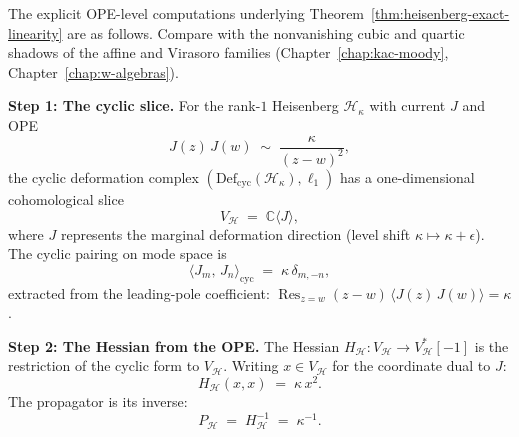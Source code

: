\begin{computation}
\label{comp:heisenberg-shadow-ope-derivation}
The explicit OPE-level computations underlying
Theorem~\ref{thm:heisenberg-exact-linearity} are as follows.
Compare with the nonvanishing cubic and quartic shadows of the affine and
Virasoro families (Chapter~\ref{chap:kac-moody},
Chapter~\ref{chap:w-algebras}).

\medskip
\noindent\textbf{Step 1: The cyclic slice.}
For the rank-$1$ Heisenberg $\mathcal{H}_\kappa$ with current $J$
and OPE
\begin{equation}\label{eq:heisenberg-ope-shadow-section}
 J(z)\,J(w) \;\sim\; \frac{\kappa}{(z-w)^2},
\end{equation}
the cyclic deformation complex
$(\mathrm{Def}_{\mathrm{cyc}}(\mathcal{H}_\kappa), \ell_1)$ has a
one-dimensional cohomological slice
\begin{equation}\label{eq:heisenberg-cyclic-slice}
 V_{\mathcal{H}} \;=\; \mathbb{C}\langle J \rangle,
\end{equation}
where $J$ represents the marginal deformation direction (level
shift $\kappa \mapsto \kappa + \epsilon$). The cyclic pairing on
mode space is
\begin{equation}\label{eq:heisenberg-cyclic-pairing}
 \langle J_m,\, J_n \rangle_{\mathrm{cyc}}
 \;=\; \kappa\,\delta_{m,-n},
\end{equation}
extracted from the leading-pole coefficient: $\operatorname{Res}_{z=w}
(z-w)\,\langle J(z)\,J(w)\rangle = \kappa$.

\medskip
\noindent\textbf{Step 2: The Hessian from the OPE.}
The Hessian $H_{\mathcal{H}} \colon
V_{\mathcal{H}} \to V_{\mathcal{H}}^*[-1]$ is the restriction of
the cyclic form to $V_{\mathcal{H}}$.
Writing $x \in V_{\mathcal{H}}$ for the coordinate dual to $J$:
\begin{equation}\label{eq:heisenberg-hessian-explicit}
 H_{\mathcal{H}}(x,x) \;=\; \kappa\,x^2.
\end{equation}
The propagator is its inverse:
\begin{equation}\label{eq:heisenberg-propagator-explicit}
 P_{\mathcal{H}} \;=\; H_{\mathcal{H}}^{-1}
 \;=\; \kappa^{-1}.
\end{equation}


\end{computation}
